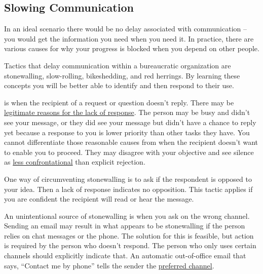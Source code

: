 \subsection*{Slowing Communication\label{sec:slowing-communication}}

In an ideal scenario there would be no delay associated with communication -- you would get the information you need when you need it. In practice, there are various causes for why your progress is blocked when you depend on other people. 

Tactics that delay communication within a bureaucratic organization are stonewalling, slow-rolling, bikeshedding, and red herrings. By learning these concepts you will be better able to identify and then respond to their use.

\iftoggle{glossaryinmargin}{\marginpar{[Glossary]}}{}
\iftoggle{glossarysubstitutionworks}{\Gls{stonewalling}}{Stonewalling} 
is when the recipient of a request or question  doesn't reply. There may be \hyperref[sec:email-responsiveness]{legitimate reasons for the lack of response}.
\iftoggle{haspagenumbers}{\marginpar{See page~\pageref{sec:email-responsiveness}.}}{}%
The person may be busy and didn't see your message, or they did see your message but didn't have a chance to reply yet because a response to you is lower priority than other tasks they have. You cannot differentiate those reasonable causes from when the recipient doesn't want to enable you to proceed. They may disagree with your objective and see silence as \href{https://en.wikipedia.org/wiki/Passive-aggressive_behavior}{less confrontational}
\iftoggle{WPinmargin}{\marginpar{$>$Wikipedia: Passive-aggressive behavior}}{}
than explicit rejection. 

One way of circumventing stonewalling is to ask if the respondent is opposed to your idea. 
%
%
Then a lack of response indicates no opposition. This tactic applies if you are confident the recipient will read or hear the message.

An unintentional source of stonewalling is when you ask on the wrong channel. Sending an email may result in what appears to be stonewalling if the person relies on chat messages or the phone. The solution for this
%
%
is feasible, but action is required by the person who doesn't respond. The person who only uses certain channels should explicitly indicate that. An automatic out-of-office email that says, ``Contact me by phone'' tells the sender the \hyperref[sec:communication-preferences]{preferred channel}. 

